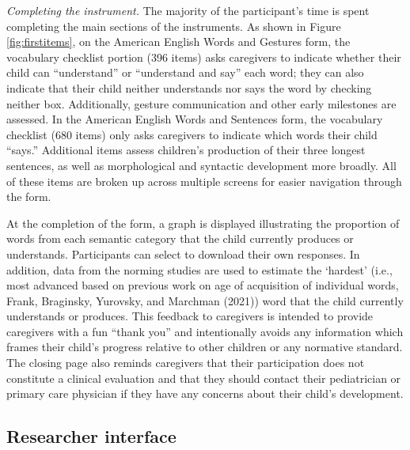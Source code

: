\documentclass[
  english,
  ,man,floatsintext]{apa6}
\begin{document}
\emph{Completing the instrument.} The majority of the participant's time is spent completing the main sections of the instruments. As shown in Figure \ref{fig:firstitems}, on the American English Words and Gestures form, the vocabulary checklist portion (396 items) asks caregivers to indicate whether their child can ``understand'' or ``understand and say'' each word; they can also indicate that their child neither understands nor says the word by checking neither box. Additionally, gesture communication and other early milestones are assessed. In the American English Words and Sentences form, the vocabulary checklist (680 items) only asks caregivers to indicate which words their child ``says.'' Additional items assess children's production of their three longest sentences, as well as morphological and syntactic development more broadly. All of these items are broken up across multiple screens for easier navigation through the form.

At the completion of the form, a graph is displayed illustrating the proportion of words from each semantic category that the child currently produces or understands. Participants can select to download their own responses. In addition, data from the norming studies are used to estimate the `hardest' (i.e., most advanced based on previous work on age of acquisition of individual words, Frank, Braginsky, Yurovsky, and Marchman (2021)) word that the child currently understands or produces. This feedback to caregivers is intended to provide caregivers with a fun ``thank you'' and intentionally avoids any information which frames their child's progress relative to other children or any normative standard. The closing page also reminds caregivers that their participation does not constitute a clinical evaluation and that they should contact their pediatrician or primary care physician if they have any concerns about their child's development.

\hypertarget{researcher-interface}{%
\subsection{Researcher interface}\label{researcher-interface}}
\end{document}
